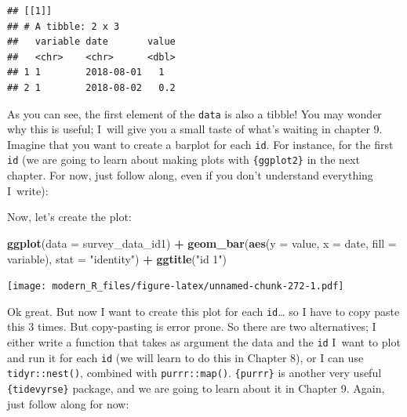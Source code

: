 \documentclass[]{gitbook}
\newenvironment{Shaded}{\begin{snugshade}}{\end{snugshade}}
\newcommand{\DataTypeTok}[1]{\textcolor[rgb]{0.13,0.29,0.53}{#1}}
\newcommand{\DecValTok}[1]{\textcolor[rgb]{0.00,0.00,0.81}{#1}}
\newcommand{\KeywordTok}[1]{\textcolor[rgb]{0.13,0.29,0.53}{\textbf{#1}}}
\newcommand{\NormalTok}[1]{#1}
\newcommand{\OperatorTok}[1]{\textcolor[rgb]{0.81,0.36,0.00}{\textbf{#1}}}
\newcommand{\StringTok}[1]{\textcolor[rgb]{0.31,0.60,0.02}{#1}}
\begin{document}
\begin{verbatim}
## [[1]]
## # A tibble: 2 x 3
##   variable date       value
##   <chr>    <chr>      <dbl>
## 1 1        2018-08-01   1  
## 2 1        2018-08-02   0.2
\end{verbatim}

As you can see, the first element of the \texttt{data} is also a tibble! You may wonder why this is useful;
I~will give you a small taste of what's waiting in chapter 9. Imagine that you want to create a
barplot for each \texttt{id}. For instance, for the first \texttt{id} (we are going to learn about making plots
with \texttt{\{ggplot2\}} in the next chapter. For now, just follow along, even if you don't understand
everything I~write):

\begin{Shaded}
\end{Shaded}

Now, let's create the plot:

\begin{Shaded}
\begin{Highlighting}[]
\KeywordTok{ggplot}\NormalTok{(}\DataTypeTok{data =}\NormalTok{ survey_data_id1) }\OperatorTok{+}
\StringTok{    }\KeywordTok{geom_bar}\NormalTok{(}\KeywordTok{aes}\NormalTok{(}\DataTypeTok{y =}\NormalTok{ value, }\DataTypeTok{x =}\NormalTok{ date, }\DataTypeTok{fill =}\NormalTok{ variable), }\DataTypeTok{stat =} \StringTok{"identity"}\NormalTok{) }\OperatorTok{+}
\StringTok{    }\KeywordTok{ggtitle}\NormalTok{(}\StringTok{"id 1"}\NormalTok{)}
\end{Highlighting}
\end{Shaded}

\texttt{[image: modern\_R\_files/figure-latex/unnamed-chunk-272-1.pdf]}

Ok great. But now I want to create this plot for each \texttt{id}\ldots{} so I have to copy paste this 3 times.
But copy-pasting is error prone. So there are two alternatives; I either write a function that
takes as argument the data and the \texttt{id} I~want to plot and run it for each \texttt{id} (we will learn to
do this in Chapter 8), or I can use \texttt{tidyr::nest()}, combined with \texttt{purrr::map()}. \texttt{\{purrr\}} is
another very useful \texttt{\{tidevyrse\}} package, and we are going to learn about it in Chapter 9. Again,
just follow along for now:
\end{document}
